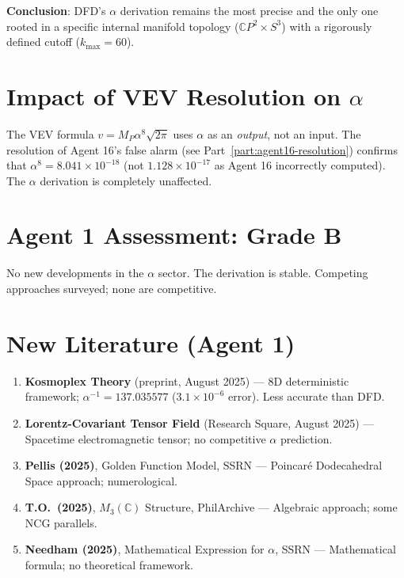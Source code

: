 \documentclass[11pt,a4paper]{article}
\newcommand{\CP}{\mathbb{C}P}
\begin{document}
\textbf{Conclusion}: DFD's $\alpha$ derivation remains the most precise and the only one rooted in a specific internal manifold topology ($\CP^2 \times S^3$) with a rigorously defined cutoff ($k_{\max} = 60$).

\section{Impact of VEV Resolution on $\alpha$}

The VEV formula $v = M_P \alpha^8 \sqrt{2\pi}$ uses $\alpha$ as an \emph{output}, not an input. The resolution of Agent 16's false alarm (see Part~\ref{part:agent16-resolution}) confirms that $\alpha^8 = 8.041 \times 10^{-18}$ (not $1.128 \times 10^{-17}$ as Agent 16 incorrectly computed). The $\alpha$ derivation is completely unaffected.

\section{Agent 1 Assessment: Grade B}

No new developments in the $\alpha$ sector. The derivation is stable. Competing approaches surveyed; none are competitive.

\section{New Literature (Agent 1)}

\begin{enumerate}
\item \textbf{Kosmoplex Theory} (preprint, August 2025) --- 8D deterministic framework; $\alpha^{-1} = 137.035577$ ($3.1 \times 10^{-6}$ error). Less accurate than DFD.
\item \textbf{Lorentz-Covariant Tensor Field} (Research Square, August 2025) --- Spacetime electromagnetic tensor; no competitive $\alpha$ prediction.
\item \textbf{Pellis (2025)}, Golden Function Model, SSRN --- Poincar\'e Dodecahedral Space approach; numerological.
\item \textbf{T.O.\ (2025)}, $M_3(\mathbb{C})$ Structure, PhilArchive --- Algebraic approach; some NCG parallels.
\item \textbf{Needham (2025)}, Mathematical Expression for $\alpha$, SSRN --- Mathematical formula; no theoretical framework.
\end{enumerate}


\end{document}
